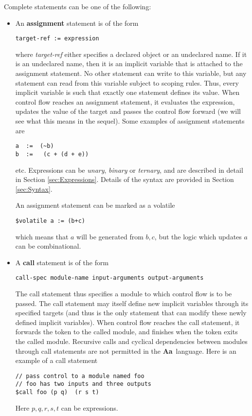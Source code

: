 \documentclass{article}
\newcommand{\Aa}{{\bf Aa}~}
\begin{document}
Complete statements can be one of the following:
\begin{itemize}
\item An {\bf assignment} statement is of the form
\begin{verbatim}
target-ref := expression
\end{verbatim}
where {\em target-ref} either specifies a declared object
or an undeclared name.  If it is an undeclared name, then
it is an implicit variable that is attached to the
assignment statement.  No other statement can write to this
variable, but any statement can read from this variable
subject to scoping rules.  Thus, every implicit variable
is such that exactly one statement defines its value.
When control flow reaches an assignment statement, it
evaluates the expression, updates the value of the target
and passes the control flow forward (we will see what this
means in the sequel).
Some examples of assignment statements are 
\begin{verbatim}
a  :=  (~b)
b  :=   (c + (d + e))
\end{verbatim}
etc.   Expressions can be {\em unary},
{\em binary} or {\em ternary}, and are
described in detail in Section \ref{sec:Expressions}.
Details of the syntax are provided in 
Section \ref{sec:Syntax}.

An assignment statement can be marked as a volatile
\begin{verbatim}
$volatile a := (b+c)
\end{verbatim}
which means that $a$ will be generated from $b,c$, but
the logic which updates $a$ can be combinational.

\item A {\bf call} statement is of the form
\begin{verbatim}
call-spec module-name input-arguments output-arguments
\end{verbatim}
The call statement thus specifies a module to which control flow
is to be passed.  The call statement may itself define new implicit
variables through its specified targets (and thus is the only
statement that can modify these newly defined implicit variables).
When control flow reaches the call statement, it forwards the
token to the called module, and finishes when the token exits
the called module.  Recursive calls and cyclical dependencies between
modules through call statements are not permitted in the \Aa language.
Here is an example of a call statement
\begin{verbatim}
// pass control to a module named foo
// foo has two inputs and three outputs
$call foo (p q)  (r s t)
\end{verbatim}
Here $p,q,r,s,t$ can be expressions.


\end{itemize}
\end{document}
